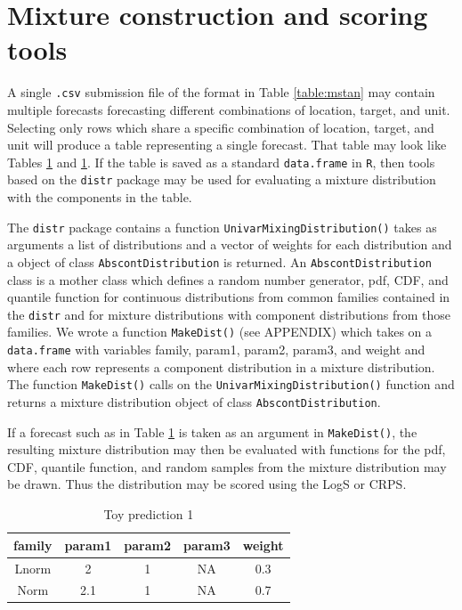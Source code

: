 \documentclass[11pt,notitlepage]{isuthesis}
\begin{document}
\section{Mixture construction and scoring tools}
\label{section:tools}

A single \texttt{.csv} submission file of the format in Table \ref{table:mstan} 
may contain multiple forecasts forecasting different combinations of location,
target, and unit. Selecting only rows which share a specific combination of 
location, target, and unit will produce a table representing a single forecast.
That table may look like Tables \ref{tab:preddf1} and 
\ref{tab:preddf1}. If the table is saved as a standard \texttt{data.frame} in 
\texttt{R}, then tools based on the \texttt{distr} package 
\cite{camphausen2007distr} may be used for evaluating a mixture distribution 
with the components in the table. 


The \texttt{distr} package contains a function 
\texttt{UnivarMixingDistribution()} takes as arguments a list of distributions
and a vector of weights for each distribution and a object of class 
\texttt{AbscontDistribution} is returned. An \texttt{AbscontDistribution} class
is a mother class which defines a random number generator, pdf,
CDF, and quantile function for continuous distributions from common
families contained in the \texttt{distr} and for mixture distributions with 
component distributions from those families.
We wrote a function \texttt{MakeDist()} (see APPENDIX)
which takes on a \texttt{data.frame} with variables
family, param1, param2, param3, and weight and where each row represents a
component distribution in a mixture distribution. The function 
\texttt{MakeDist()} calls on the \texttt{UnivarMixingDistribution()} function
and returns a mixture distribution object of class \texttt{AbscontDistribution}.

If a forecast such as in Table \ref{tab:preddf1} is taken as an argument in 
\texttt{MakeDist()}, the resulting mixture distribution may then be evaluated 
with functions for the pdf, CDF, quantile function, and random samples from the
mixture distribution may be drawn. Thus the distribution may be scored using the
LogS or CRPS.



\begin{table}[h!]
\centering
 \begin{tabular}{|c|c|c|c|c|}
 \hline
    family & param1 & param2 & param3 & weight
    \\ \hline
    Lnorm & 2 & 1 & NA & 0.3  \\
    Norm & 2.1 & 1 & NA & 0.7 \\
 \hline
 \end{tabular}
 \caption[Illustrative forecast 1]{Toy prediction 1}
 \label{tab:preddf1}
\end{table}
\end{document}
